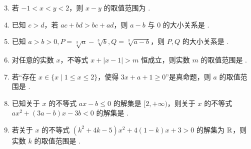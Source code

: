 \documentclass[a4paper,11pt]{article}
\begin{document}


\begin{enumerate}
\setcounter{enumi}{2}

\item 若 $-1<x<y<2$，则 $x-y$ 的取值范围为 \blankline[4.4em].

\ifanswer
\solbegin
{}
\solend
\fi

\item 已知 $c>d$，若 $ac+bd>bc+ad$，则 $a-b$ 与 $0$ 的大小关系是 \blankline[4.4em].

\ifanswer
\solbegin
{}
\solend
\fi

\item 已知 $a>b>0,P=\sqrt[3]{a}-\sqrt[3]{b},Q=\sqrt[3]{a-b}$，则 $P,Q$ 的大小关系是 \blankline[4.4em].

\ifanswer
\solbegin
{}
\solend
\fi

\item 对任意的实数 $x$，不等式 $x+|x-1|>m$ 恒成立，则实数 $m$ 的取值范围是 \blankline[4.4em].

\ifanswer
\solbegin
{}
\solend
\fi

\item 若“存在 $x\in\{x\mid1\leqslant x\leqslant2\}$，使得 $3x+a+1\geqslant0$”是真命题，则 $a$ 的取值范围是 \blankline[4.4em].

\ifanswer
\solbegin
{}
\solend
\fi

\item 已知关于 $x$ 的不等式 $ax-b\leqslant0$ 的解集是 $[2,+\infty)$，则关于 $x$ 的不等式
$ax^2+(3a-b)x-3b<0$ 的解集是 \blankline[4.4em].

\ifanswer
\solbegin
{}
\solend
\fi

\item 若关于 $x$ 的不等式 $(k^2+4k-5)x^2+4(1-k)x+3>0$ 的解集为 $\mathbb{R}$，则实数 $k$ 的取值范围是 \blankline[4.4em].


\end{enumerate}
\end{document}
